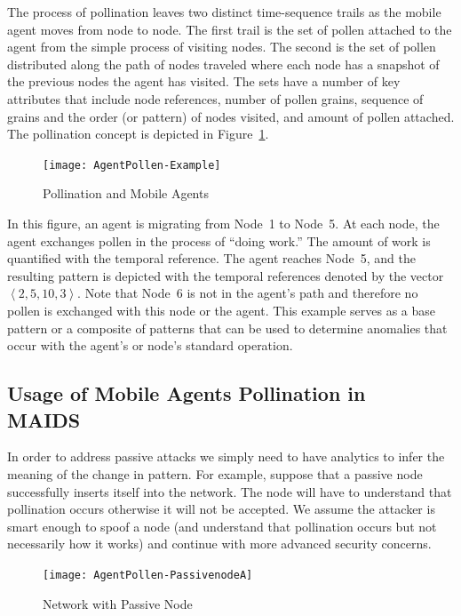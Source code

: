 \documentclass{acm_proc_article-sp}
\begin{document}
The process of pollination leaves two distinct time-sequence trails as the mobile agent moves from node to node.  The first trail is the set of pollen attached to the agent from the simple process of visiting nodes.  The second is the set of pollen distributed along the path of nodes traveled where each node has a snapshot of the previous nodes the agent has visited.  The sets have a number of key attributes that include node references, number of pollen grains, sequence of grains and the order (or pattern) of nodes visited, and amount of pollen attached.  The pollination concept is depicted in Figure~\ref{fig:map-overview}.

\begin{figure}
\centering
\texttt{[image: AgentPollen-Example]}
\caption{Pollination and Mobile Agents}
\label{fig:map-overview}
\end{figure}

In this figure, an agent is migrating from Node~1 to Node~5.  At each node, the agent exchanges pollen in the process of ``doing work.''  The amount of work is quantified with the temporal reference.  The agent reaches Node~5, and the resulting pattern is depicted with the temporal references denoted by the vector $\left<2, 5, 10, 3\right>$.  Note that Node~6 is not in the agent's path and therefore no pollen is exchanged with this node or the agent.  This example serves as a base pattern or a composite of patterns that can be used to determine anomalies that occur with the agent's or node's standard operation.

\subsection{Usage of Mobile Agents Pollination in\\MAIDS}
In order to address passive attacks we simply need to have analytics to infer the meaning of the change in pattern.  For example, suppose that a passive node successfully inserts itself into the network.  The node will have to understand that pollination occurs otherwise it will not be accepted.  We assume the attacker is smart enough to spoof a node (and understand that pollination occurs but not necessarily how it works) and continue with more advanced security concerns.

\begin{figure}
\centering
\texttt{[image: AgentPollen-PassivenodeA]}
\caption{Network with Passive Node}
\label{fig:map-eg}
\end{figure}
\end{document}
